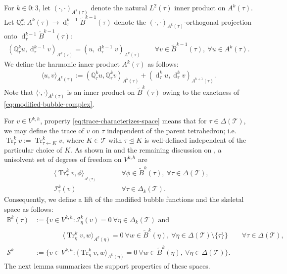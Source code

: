 \documentclass{mcom-l}
\theoremstyle{definition}
\theoremstyle{remark}
\numberwithin{equation}{section}
\DeclareMathOperator{\dee}{d}
\DeclareMathOperator{\from}{\leftarrow}
\DeclareMathOperator{\Tr}{Tr}
\DeclareMathOperator{\subsimplex}{\unlhd}
\newcommand{\mesh}[0]{\mathcal{T}}
\begin{document}
For $k \in 0:3$, let $(\cdot,\cdot)_{A^k(\tau)}$ denote the natural 
$L^2(\tau)$ inner product on $A^k(\tau)$. Let 
$\mathbb{Q}^k_{\tau} : A^k(\tau) \to \dee_{\tau}^{k-1} \tilde{B}^{k-1}(\tau)$ 
denote the $(\cdot,\cdot)_{A^k(\tau)}$-orthogonal projection onto 
$\dee_{\tau}^{k-1} \tilde{B}^{k-1}(\tau)$:
\begin{align*}
	(\mathbb{Q}^k_{\tau} u, \dee_{\tau}^{k-1} v)_{A^k(\tau)}
	= (u, \dee_{\tau}^{k-1} v)_{A^k(\tau)} 
	\qquad \forall v \in \tilde{B}^{k-1}(\tau),
	\ \forall u \in A^k(\tau).
\end{align*}
We define the harmonic inner product $A^k(\tau)$ 
\cite[Definition 5.1]{HuLiangLin25} as follows:
\begin{align*}
	\langle u, v \rangle_{A^k(\tau)} 
	:= (\mathbb{Q}^k_{\tau} u, \mathbb{Q}^k_{\tau} v)_{A^k(\tau)}
	+ (\dee_{\tau}^k u, \dee_{\tau}^k v)_{A^{k+1}(\tau)}.
\end{align*}
Note that $\langle \cdot, \cdot \rangle_{A^k(\tau)}$ is an inner product 
on $\tilde{B}^k(\tau)$ owing to the exactness of 
\cref{eq:modified-bubble-complex}. 

For $v \in V^{k, h}$, property \cref{eq:trace-characterizes-space} means 
that for $\tau \in \Delta(\mesh)$, we may define the trace of $v$ on $\tau$
independent of the parent tetrahedron; i.e. 
$\Tr^k_{\tau} v := \Tr^k_{\tau \from K} v$,
where $K \in \mesh$ with $\tau \subsimplex K$ is well-defined independent
of the particular choice of $K$. 
As shown in \cite[Lemma 5.2]{HuLiangLin25} and the remaining discussion on 
\cite[p. 29]{HuLiangLin25}, a unisolvent set of degrees of freedom on 
$V^{k, h}$ are 
\begin{subequations}
	\label{eq:global-dofs-bubble}
	\begin{alignat}{2}
		&\langle \Tr^k_{\tau} v, \phi \rangle_{_{A^k(\tau)}} 
		\qquad 
		& &\forall \phi \in \tilde{B}^k(\tau), 
		\ \forall \tau \in \Delta(\mesh), \\
		&\mathcal{I}_{\tau}^k(v) \qquad 
		& &\forall \tau \in \Delta_k(\mesh).
	\end{alignat}
\end{subequations}
Consequently, we define a lift 
of the modified bubble functions and the skeletal space as follows:
\begin{align*}
	\mathbb{B}^k(\tau) &:= \{ v \in V^{k, h} :  
	\mathcal{I}^k_{\eta}(v) = 0 \ \forall \eta \in \Delta_k(\mesh) 
	\text{ and} \\
	&\qquad \qquad 
	\langle \Tr_{\eta}^k v, w \rangle_{A^k(\eta)} = 0 
	\ \forall w \in \tilde{B}^k(\eta), 
	\ \forall \eta \in \Delta(\mesh) \setminus \{\tau\}
	\} \qquad \forall \tau \in \Delta(\mesh),\\
	\mathcal{S}^k &:= \{ v \in V^{k, h} : 
	\langle \Tr_{\eta}^k v, w \rangle_{A^k(\eta)} = 0 
	\ \forall w \in \tilde{B}^k(\eta), 
	\ \forall \eta \in \Delta(\mesh) \}.
\end{align*}
The next lemma summarizes the support properties of these spaces.
\end{document}
